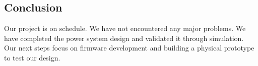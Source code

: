 \documentclass[a4paper,11pt]{article}%
\begin{document}
\subsection{Conclusion}

Our project is on schedule. We have not encountered any major problems. We have completed the power system design and validated it through simulation. Our next steps focus on firmware development and building a physical prototype to test our design.








\end{document}
